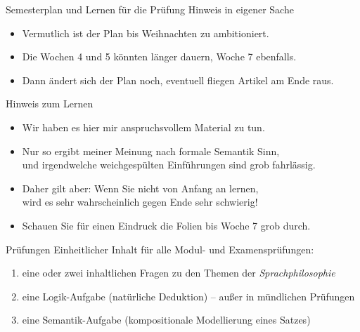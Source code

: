 \begin{frame}
  {Semesterplan und Lernen für die Prüfung}
  \onslide<+->
  \onslide<+->
  \centering 
  \alert{\large Hinweis in eigener Sache}\\
  \Halbzeile
  \begin{itemize}[<+->]
    \item Vermutlich ist der Plan bis Weihnachten zu ambitioniert.
    \item Die Wochen 4 und 5 könnten länger dauern, Woche 7 ebenfalls.
    \item Dann ändert sich der Plan noch, eventuell fliegen Artikel am Ende raus.
  \end{itemize}
  \Zeile
  \onslide<+->
  \alert{\large Hinweis zum Lernen}\\
  \Halbzeile
  \begin{itemize}[<+->]
    \item Wir haben es hier mir anspruchsvollem Material zu tun.
    \item Nur so ergibt meiner Meinung nach formale Semantik Sinn,\\
      und irgendwelche weichgespülten Einführungen sind grob fahrlässig.
    \item Daher gilt aber: Wenn Sie nicht von Anfang an lernen,\\
      wird es sehr wahrscheinlich gegen Ende sehr schwierig!
      \Halbzeile
    \item \alert{Schauen Sie für einen Eindruck die Folien bis Woche 7 grob durch.}
  \end{itemize}
\end{frame}

\begin{frame}
  {Prüfungen}
  \onslide<+->
  \onslide<+->
  Einheitlicher Inhalt für alle Modul- und Examensprüfungen:\\
  \Zeile
  \begin{enumerate}[<+->]
    \item eine oder zwei inhaltlichen Fragen zu den Themen der \textit{Sprachphilosophie}\\
    \item eine Logik-Aufgabe (natürliche Deduktion) -- \alert{außer in mündlichen Prüfungen}
    \item eine Semantik-Aufgabe (kompositionale Modellierung eines Satzes)
  \end{enumerate}
  \Zeile
  \onslide<+->
\end{frame}


